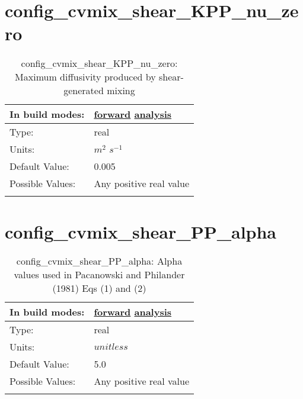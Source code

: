 \section[config\_cvmix\_shear\_KPP\_nu\_zero]{config\_cvmix\_shear\_KPP\_nu\_zero}
\label{sec:nm_sec_config_cvmix_shear_KPP_nu_zero}
\begin{center}
\begin{longtable}{| p{2.0in} || p{4.0in} |}
    \hline
    In build modes: & \hyperref[subsec:forward_nm_tab_cvmix]{forward} \hyperref[subsec:analysis_nm_tab_cvmix]{analysis} \\
    \hline
    Type: & real \\
    \hline
    Units: & $m^2$ $s^{-1}$ \\
    \hline
    Default Value: & 0.005 \\
    \hline
    Possible Values: & Any positive real value \\
    \hline
    \caption{config\_cvmix\_shear\_KPP\_nu\_zero: Maximum diffusivity produced by shear-generated mixing}
\end{longtable}
\end{center}
\section[config\_cvmix\_shear\_PP\_alpha]{config\_cvmix\_shear\_PP\_alpha}
\label{sec:nm_sec_config_cvmix_shear_PP_alpha}
\begin{center}
\begin{longtable}{| p{2.0in} || p{4.0in} |}
    \hline
    In build modes: & \hyperref[subsec:forward_nm_tab_cvmix]{forward} \hyperref[subsec:analysis_nm_tab_cvmix]{analysis} \\
    \hline
    Type: & real \\
    \hline
    Units: & $unitless$ \\
    \hline
    Default Value: & 5.0 \\
    \hline
    Possible Values: & Any positive real value \\
    \hline
    \caption{config\_cvmix\_shear\_PP\_alpha: Alpha values used in Pacanowski and Philander (1981) Eqs (1) and (2)}
\end{longtable}
\end{center}
